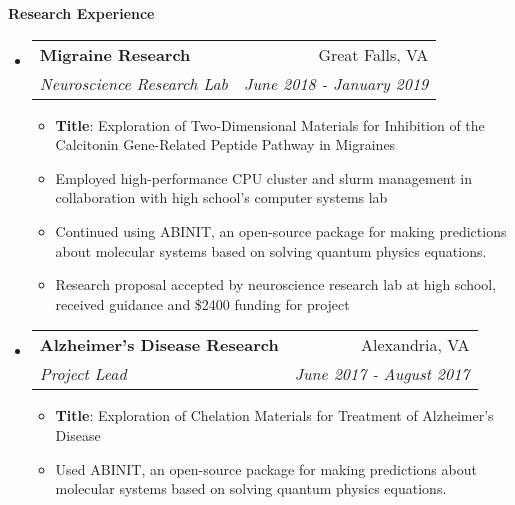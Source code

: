 \documentclass[letterpaper,10pt]{article}
\makeatletter
\newcommand{\resitem}[1]{\item #1 \vspace{-2pt}}
\newcommand{\resheading}[1]{{\large \colorbox{mygrey}{\begin{minipage}{\textwidth}{\textbf{#1 \vphantom{p\^{E}}}}\end{minipage}}}}
\newcommand{\ressubheading}[4]{
\begin{tabular*}{7.0in}{l@{\extracolsep{\fill}}r}
		\textbf{#1} & #2 \\
		\textit{#3} & \textit{#4} \\
\end{tabular*}\vspace{-6pt}}
\makeatother
\begin{document}
\pagebreak

\resheading{Research Experience}
\begin{itemize}
\item
	\ressubheading{Migraine Research}{Great Falls, VA}{Neuroscience Research Lab}{June 2018 - January 2019}
	\begin{itemize}
		\resitem{\textbf{Title}: Exploration of Two-Dimensional Materials for Inhibition of the Calcitonin Gene-Related Peptide Pathway in Migraines}
	    \resitem{Employed high-performance CPU cluster and slurm management in collaboration with high school's computer systems lab}
	    \resitem{Continued using ABINIT, an open-source package for making predictions about molecular systems based on solving quantum physics equations.}
	    \resitem{Research proposal accepted by neuroscience research lab at high school, received guidance and \$2400 funding for project}
	\end{itemize}
\item
	\ressubheading{Alzheimer's Disease Research}{Alexandria, VA}{Project Lead}{June 2017 - August 2017}
	\begin{itemize}
	    \resitem{\textbf{Title}: Exploration of Chelation Materials for Treatment of Alzheimer's Disease}
		\resitem{Used ABINIT, an open-source package for making predictions about molecular systems based on solving quantum physics equations.}

\end{itemize}
\end{itemize}
\end{document}
